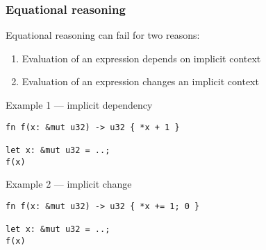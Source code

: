 \documentclass[t]{beamer}
\begin{document}
\begin{frame}[fragile]
\frametitle{Equational reasoning}
\begin{comment}
An expression that depends on an implicit context can evaluate to different results at
different points in the program.

In example 1, the expression `f(x)` applying the same function to the same reference
could return different values at different points in the program. It depends on an
implicit mutable store.

An expression that *changes* an implicit context is not safe to inline, even if it
returns the same result every time. Inlining such expressions can change the meaning
of the program, because the program's meaning depends on how many times the expression
is evaluated.

\end{comment}

Equational reasoning can fail for two reasons:

\begin{enumerate}
\item Evaluation of an expression depends on implicit context
\item Evaluation of an expression changes an implicit context
\end{enumerate}

\begin{block}{Example 1 --- implicit dependency}
\begin{verbatim}
fn f(x: &mut u32) -> u32 { *x + 1 }

let x: &mut u32 = ..;
f(x)
\end{verbatim}
\end{block}

\begin{block}{Example 2 --- implicit change}
\begin{verbatim}
fn f(x: &mut u32) -> u32 { *x += 1; 0 }

let x: &mut u32 = ..;
f(x)
\end{verbatim}
\end{block}

\end{frame}
\end{document}
